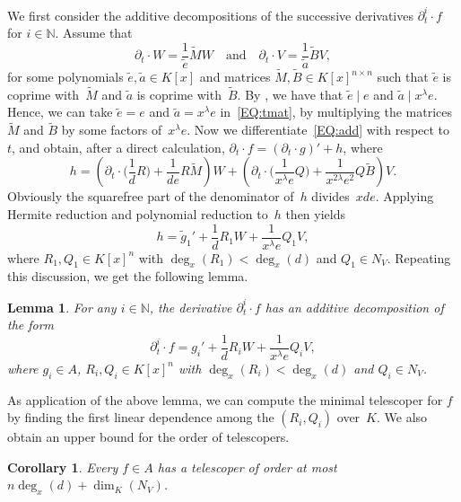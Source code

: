 \documentclass[final,1p,times,authoryear]{elsarticle}
\newtheorem{corollary}[theorem]{Corollary}
\newtheorem{lemma}[theorem]{Lemma}
\newcommand{\bN}{ {\mathbb N}}
\begin{document}
We first consider the additive decompositions of the successive derivatives $\partial_t^i\cdot f$ for $i\in \bN$.
Assume that
\begin{equation}\label{EQ:tmat}
  \partial_t\cdot W = \frac{1}{\tilde{e}} \tilde{M}W
  \quad \text{and}\quad
  \partial_t\cdot V = \frac{1}{\tilde{a}} \tilde{B}V,
\end{equation}
for some polynomials $\tilde{e},\tilde{a}\in K[x]$ and matrices
$\tilde{M},\tilde{B}\in K[x]^{n\times n}$ such that $\tilde{e}$ is coprime
with~$\tilde{M}$ and $\tilde{a}$ is coprime with~$\tilde{B}$.  By
\cite[Prop.~7]{chen14a}, we have that $\tilde e \mid e$ and $\tilde{a} \mid
x^\lambda e$.  Hence, we can take $\tilde{e} = e$ and $\tilde{a} = x^\lambda
e$ in~\eqref{EQ:tmat}, by multiplying the matrices $\tilde{M}$ and $\tilde{B}$
by some factors of~$x^\lambda e$. Now we differentiate~\eqref{EQ:add} with
respect to~$t$, and obtain, after a direct calculation, $\partial_t\cdot f =
(\partial_t\cdot g)' + h$, where
\[
  h =
    \left(\partial_t\cdot\biggl(\frac{1}{d}R\biggr) + \frac{1}{de}R\tilde{M}\right)W +
    \left(\partial_t\cdot\biggl(\frac{1}{x^\lambda e}Q\biggr) + \frac{1}{x^{2\lambda} e^2}Q\tilde{B}\right)V.
\]
Obviously the squarefree part of the denominator of~$h$
divides~$xde$. Applying Hermite reduction and polynomial reduction to~$h$
then yields
\[
  h = \tilde g_1' + \frac{1}{d} R_1W + \frac{1}{x^\lambda e} Q_1V,
\]
where $R_1, Q_1\in K[x]^n$ with $\deg_x(R_1) < \deg_x(d)$ and $Q_1\in N_V$.
Repeating this discussion, we get the following lemma.
\begin{lemma}\label{LEM:idtf}
For any $i\in \bN$, the derivative $\partial_t^i\cdot f$ has an additive decomposition of the form
\[ \partial_t^i\cdot f = g_i' + \frac{1}{d} R_iW + \frac{1}{x^\lambda e} Q_iV,\]
where $g_i\in A$, $R_i, Q_i\in K[x]^n$ with $\deg_x(R_i) < \deg_x(d)$ and $Q_i\in N_V$.
\end{lemma}
As application of the above lemma, we can compute the minimal telescoper for $f$ by finding the first
linear dependence among the $(R_i, Q_i)$ over~$K$. We also obtain an upper bound for the order of telescopers.
\begin{corollary}
Every $f\in A$ has a telescoper of order at most $n\deg_x(d) + \dim_K(N_V)$.
\end{corollary}
\end{document}
